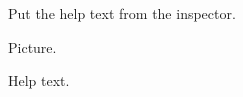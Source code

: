 Put the help text from the inspector.

\startsubject[title=Example Widget]

    Picture.

    Help text.

\stopsubject

